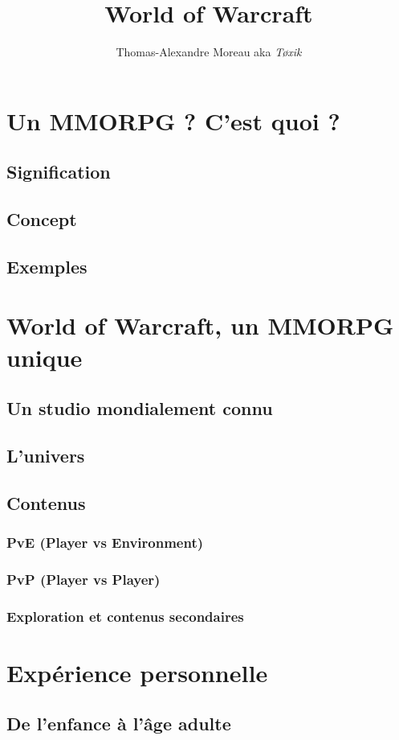 \documentclass{article}
\title{\Huge World of Warcraft}
\author{Thomas-Alexandre Moreau aka \textit{Tøxik}}
\begin{document}
\maketitle

\pagebreak

\tableofcontents

\pagebreak

\section{Un MMORPG ? C'est quoi ?}

\subsection{Signification}

\subsection{Concept}

\subsection{Exemples}

\pagebreak

\section{World of Warcraft, un MMORPG unique}

\subsection{Un studio mondialement connu}

\subsection{L'univers}

\subsection{Contenus}

\subsubsection{PvE (Player vs Environment)}

\subsubsection{PvP (Player vs Player)}

\subsubsection{Exploration et contenus secondaires}

\pagebreak

\section{Expérience personnelle}

\subsection{De l'enfance à l'âge adulte}
\end{document}
